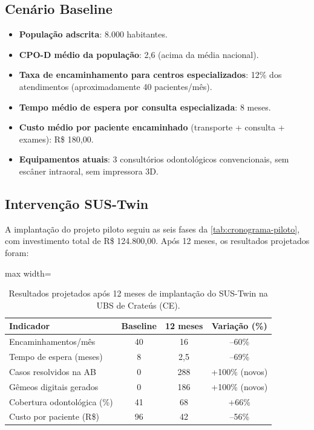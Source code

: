 \subsection{Cenário Baseline}

\begin{itemize}
    \item \textbf{População adscrita}: 8.000 habitantes.
    \item \textbf{CPO-D médio da população}: 2,6 (acima da média nacional).
    \item \textbf{Taxa de encaminhamento para centros especializados}:
        12\% dos atendimentos (aproximadamente 40 pacientes/mês).
    \item \textbf{Tempo médio de espera por consulta especializada}:
        8 meses.
    \item \textbf{Custo médio por paciente encaminhado} (transporte +
        consulta + exames): R\$ 180,00.
    \item \textbf{Equipamentos atuais}: 3 consultórios odontológicos
        convencionais, sem escâner intraoral, sem impressora 3D.
\end{itemize}

\subsection{Intervenção SUS-Twin}

A implantação do projeto piloto seguiu as seis fases da
\autoref{tab:cronograma-piloto}, com investimento total de
R\$ 124.800,00. Após 12 meses, os resultados projetados foram:

\begin{table}[htbp]
\centering
\caption{Resultados projetados após 12 meses de implantação do SUS-Twin
         na UBS de Crateús (CE).}
\label{tab:resultados-crateus}
\begin{adjustbox}{max width=\textwidth}
\begin{tabular}{lccc}
\toprule
\textbf{Indicador} & \textbf{Baseline} & \textbf{12 meses} &
\textbf{Variação (\%)} \\
\midrule
Encaminhamentos/mês       & 40  & 16  & --60\% \\
Tempo de espera (meses)   & 8   & 2,5 & --69\% \\
Casos resolvidos na AB    & 0   & 288 & +100\% (novos) \\
Gêmeos digitais gerados   & 0   & 186 & +100\% (novos) \\
Cobertura odontológica (\%) & 41 & 68 & +66\% \\
Custo por paciente (R\$)  & 96  & 42  & --56\% \\
\bottomrule
\end{tabular}
\end{adjustbox}
\end{table}

